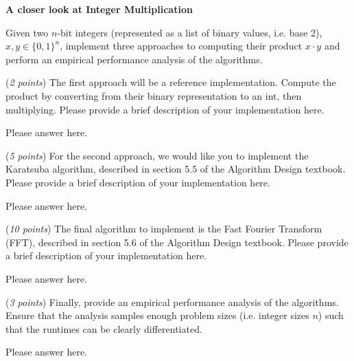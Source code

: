 \documentclass{hw}
\begin{document}
\begin{challenge}
    \textbf{A closer look at Integer Multiplication}
    
    Given two $n$-bit integers (represented as a list of binary values, i.e. base 2), $x, y\in\{0,1\}^n$,
    implement three approaches to computing their product $x \cdot y$
    and perform an empirical performance analysis of the algorithms.

    (\textit{2 points}) The first approach will be a reference implementation. Compute the product by converting from their binary representation to an int, then multiplying. Please provide a brief description of your implementation here.
    
    \begin{solution}
        Please answer here.
    \end{solution}

    (\textit{5 points}) For the second approach,
    we would like you to implement the Karatsuba algorithm,
    described in section 5.5 of the Algorithm Design textbook.
    Please provide a brief description of your implementation here.

    \begin{solution}
        Please answer here.
    \end{solution}

    (\textit{10 points}) The final algorithm to implement is the Fast Fourier Transform (FFT), described in
    section 5.6 of the Algorithm Design textbook.
    Please provide a brief description of your implementation here.

    \begin{solution}
        Please answer here.
    \end{solution}


    (\textit{3 points}) Finally, provide an empirical performance analysis of the algorithms.
    Ensure that the analysis samples enough problem sizes (i.e. integer sizes $n$)
    such that the runtimes can be clearly differentiated.
    
    \begin{solution}
        Please answer here.
    \end{solution}

\end{challenge}
\end{document}
